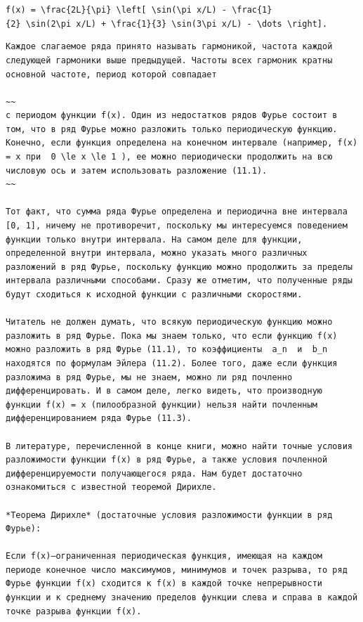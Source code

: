 \documentclass[
  ukrainian,
]{article}
\begin{document}
\texttt{f(x)\ =\ \textbackslash{}frac\{2L\}\{\textbackslash{}pi\}\ \textbackslash{}left{[}\ \textbackslash{}sin(\textbackslash{}pi\ x/L)\ -\ \textbackslash{}frac\{1\}\{2\}\ \textbackslash{}sin(2\textbackslash{}pi\ x/L)\ +\ \textbackslash{}frac\{1\}\{3\}\ \textbackslash{}sin(3\textbackslash{}pi\ x/L)\ -\ \textbackslash{}dots\ \textbackslash{}right{]}.}

\begin{verbatim}
Каждое слагаемое ряда принято называть гармоникой, частота каждой следующей гармоники выше предыдущей. Частоты всех гармоник кратны основной частоте, период которой совпадает

~~
с периодом функции f(x). Один из недостатков рядов Фурье состоит в том, что в ряд Фурье можно разложить только периодическую функцию. Конечно, если функция определена на конечном интервале (например, f(x) = x при  0 \le x \le 1 ), ее можно периодически продолжить на всю числовую ось и затем использовать разложение (11.1).
~~

Тот факт, что сумма ряда Фурье определена и периодична вне интервала [0, 1], ничему не противоречит, поскольку мы интересуемся поведением функции только внутри интервала. На самом деле для функции, определенной внутри интервала, можно указать много различных разложений в ряд Фурье, поскольку функцию можно продолжить за пределы интервала различными способами. Сразу же отметим, что полученные ряды будут сходиться к исходной функции с различными скоростями.

Читатель не должен думать, что всякую периодическую функцию можно разложить в ряд Фурье. Пока мы знаем только, что если функцию f(x) можно разложить в ряд Фурье (11.1), то коэффициенты  a_n  и  b_n  находятся по формулам Эйлера (11.2). Более того, даже если функция разложима в ряд Фурье, мы не знаем, можно ли ряд почленно дифференцировать. И в самом деле, легко видеть, что производную функции f(x) = x (пилообразной функции) нельзя найти почленным дифференцированием ряда Фурье (11.3).

В литературе, перечисленной в конце книги, можно найти точные условия разложимости функции f(x) в ряд Фурье, а также условия почленной дифференцируемости получающегося ряда. Нам будет достаточно ознакомиться с известной теоремой Дирихле.

*Теорема Дирихле* (достаточные условия разложимости функции в ряд Фурье):

Если f(x)—ограниченная периодическая функция, имеющая на каждом периоде конечное число максимумов, минимумов и точек разрыва, то ряд Фурье функции f(x) сходится к f(x) в каждой точке непрерывности функции и к среднему значению пределов функции слева и справа в каждой точке разрыва функции f(x).


\end{verbatim}
\end{document}
